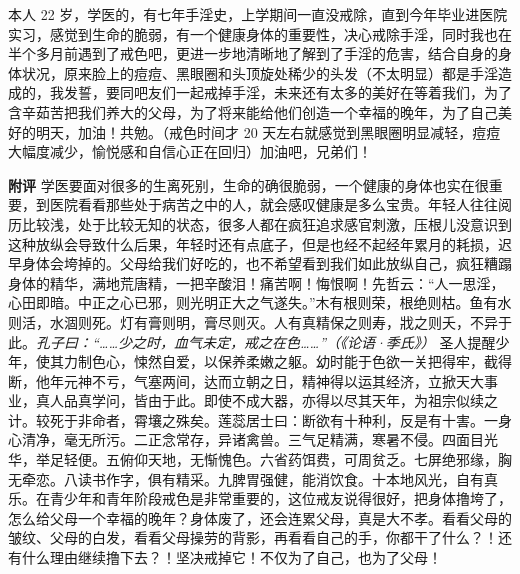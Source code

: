 \begin{case}
    本人 22 岁，学医的，有七年手淫史，上学期间一直没戒除，直到今年毕业进医院实习，感觉到生命的脆弱，有一个健康身体的重要性，决心戒除手淫，同时我也在半个多月前遇到了戒色吧，更进一步地清晰地了解到了手淫的危害，结合自身的身体状况，原来脸上的痘痘、黑眼圈和头顶旋处稀少的头发（不太明显）都是手淫造成的，我发誓，要同吧友们一起戒掉手淫，未来还有太多的美好在等着我们，为了含辛茹苦把我们养大的父母，为了将来能给他们创造一个幸福的晚年，为了自己美好的明天，加油！共勉。（戒色时间才 20 天左右就感觉到黑眼圈明显减轻，痘痘大幅度减少，愉悦感和自信心正在回归）加油吧，兄弟们！

    \textbf{附评} 学医要面对很多的生离死别，生命的确很脆弱，一个健康的身体也实在很重要，到医院看看那些处于病苦之中的人，就会感叹健康是多么宝贵。年轻人往往阅历比较浅，处于比较无知的状态，很多人都在疯狂追求感官刺激，压根儿没意识到这种放纵会导致什么后果，年轻时还有点底子，但是也经不起经年累月的耗损，迟早身体会垮掉的。父母给我们好吃的，也不希望看到我们如此放纵自己，疯狂糟蹋身体的精华，满地荒唐精，一把辛酸泪！痛苦啊！悔恨啊！先哲云：“人一思淫，心田即暗。中正之心已邪，则光明正大之气遂失。”木有根则荣，根绝则枯。鱼有水则活，水涸则死。灯有膏则明，膏尽则灭。人有真精保之则寿，戕之则夭，不异于此。\textit{孔子曰：“……少之时，血气未定，戒之在色……”（《论语·季氏》）} 圣人提醒少年，使其力制色心，悚然自爱，以保养柔嫩之躯。幼时能于色欲一关把得牢，截得断，他年元神不亏，气塞两间，达而立朝之日，精神得以运其经济，立掀天大事业，真人品真学问，皆由于此。即使不成大器，亦得以尽其天年，为祖宗似续之计。较死于非命者，霄壤之殊矣。莲蕊居士曰：断欲有十种利，反是有十害。一身心清净，毫无所污。二正念常存，异诸禽兽。三气足精满，寒暑不侵。四面目光华，举足轻便。五俯仰天地，无惭愧色。六省药饵费，可周贫乏。七屏绝邪缘，胸无牵恋。八读书作字，俱有精采。九脾胃强健，能消饮食。十本地风光，自有真乐。在青少年和青年阶段戒色是非常重要的，这位戒友说得很好，把身体撸垮了，怎么给父母一个幸福的晚年？身体废了，还会连累父母，真是大不孝。看看父母的皱纹、父母的白发，看看父母操劳的背影，再看看自己的手，你都干了什么？！还有什么理由继续撸下去？！坚决戒掉它！不仅为了自己，也为了父母！
\end{case}

